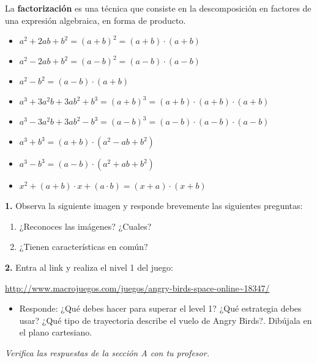 \documentclass[12pt,a4paper]{article}
\begin{document}
\vspace{5mm}


\begin{tcolorbox}[colback=fondoazul,colframe=azuloscuro,breakable]

La \textbf{factorización} es una técnica que consiste en la descomposición en factores de una expresión algebraica, en forma de producto.

\begin{itemize}
\item $a^2 + 2ab + b^2 = (a + b)^2 = (a + b) \cdot (a + b)$
\item $a^2 - 2ab + b^2 = (a - b)^2 = (a - b) \cdot (a - b)$
\item $a^2 - b^2 = (a - b) \cdot (a + b)$
\item $a^3 + 3a^2b + 3ab^2 + b^3 = (a + b)^3 = (a + b) \cdot (a + b) \cdot (a + b)$
\item $a^3 - 3a^2b + 3ab^2 - b^3 = (a - b)^3 = (a - b) \cdot (a - b) \cdot (a - b)$
\item $a^3 + b^3 = (a + b) \cdot (a^2 - ab + b^2)$
\item $a^3 - b^3 = (a - b) \cdot (a^2 + ab + b^2)$
\item $x^2 + (a + b) \cdot x + (a \cdot b) = (x + a) \cdot (x + b)$
\end{itemize}

\end{tcolorbox}

\begin{tcolorbox}[colback=fondoverde,colframe=verdeclaro,title=\textbf{PRACTICA}]

\textbf{1.} Observa la siguiente imagen y responde brevemente las siguientes preguntas:

\begin{enumerate}[label=\Alph*.]
\item ¿Reconoces las imágenes? ¿Cuales?
\item ¿Tienen características en común?
\end{enumerate}

\textbf{2.} Entra al link y realiza el nivel 1 del juego:

\url{http://www.macrojuegos.com/juegos/angry-birds-space-online~18347/}

\begin{itemize}
\item Responde: ¿Qué debes hacer para superar el level 1? ¿Qué estrategia debes usar? ¿Qué tipo de trayectoria describe el vuelo de Angry Birds?. Dibújala en el plano cartesiano.
\end{itemize}

\textit{Verifica las respuestas de la sección A con tu profesor.}

\end{tcolorbox}
\end{document}
